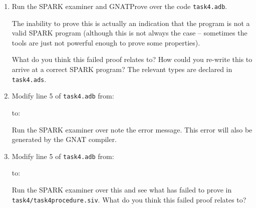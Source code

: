 \documentclass{article}
\begin{document}
\begin{enumerate}
 \item Run the SPARK examiner and GNATProve over the code  {\tt task4.adb}.

  The inability to prove this is actually an indication that the program is not a valid SPARK program (although this is not always the case -- sometimes the tools are just not powerful enough to prove some properties).

  What do you think this failed proof relates to? How could you re-write this to arrive at a correct SPARK program? The relevant types are declared in \texttt{task4.ads}.

 \item Modify line 5 of {\tt task4.adb} from:

\quad{}

  to:

\quad{}

 Run the SPARK examiner over note the error message. This error will also be generated by the GNAT compiler.



 \item Modify line 5 of {\tt task4.adb} from:

\quad{}

  to:

\quad{}

 Run the SPARK examiner over this and see what has failed to prove in {\tt task4/task4procedure.siv}. What do you think this failed proof relates to?

\begin{comment}
 \item The final task is to look at \emph{dead paths}: paths of code that are impossible to execute due to some contradiction in branches. The source is \texttt{task5.ads/b} contains a procedure that takes two Boolean variables, \texttt{A} and \texttt{B}, as input, and outputs a Boolean variable \texttt{C}, which is true if and only if \texttt{A} implies \texttt{B}. That is, if \texttt{A} is false, or \texttt{A} and \texttt{B} is both true. Study the implementation of this in \texttt{task5.adb}.

  Run the SPARK Examiner over \texttt{task5.adb}, but this time, add the switch \texttt{-dpc} to the command line:

   \quad\quad \texttt{spark -vcg -dpc -i=project.idx -config\_file=spark.cfg task5.adb}


\end{comment}
\end{enumerate}
\end{document}
